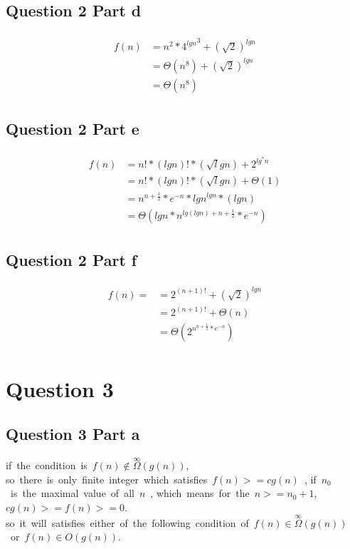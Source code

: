 \documentclass[paper=a4, fontsize=11pt]{scrartcl} %
\numberwithin{equation}{section} %
\numberwithin{figure}{section} %
\numberwithin{table}{section} %
\begin{document}
\subsection{Question 2 Part d}
\begin{align*}
\begin{split}
f(n) &=n^2*{4^{lgn}}^3+(\sqrt 2)^{lgn}\\
&=\Theta(n^8)+(\sqrt 2)^{lgn}\\
&=\Theta(n^8)
\end{split}
\end{align*}

\subsection{Question 2 Part e}
\begin{align*}
\begin{split}
f(n) &=n!*(lgn)!*(\sqrt lgn)+2^{lg^* n}\\
&=n!*(lgn)!*(\sqrt lgn)+\Theta(1)\\
&=n^{n+\frac{1}{2}}*e^{-n}*{lgn}^{lgn}*(lgn)\\
&=\Theta(lgn*n^{lg(lgn)+n+\frac{1}{2}}*e^{-n})
\end{split}
\end{align*}

\subsection{Question 2 Part f}
\begin{align*}
\begin{split}
f(n)= &=2^{(n+1)!}+{(\sqrt 2)}^{lgn}\\
&=2^{(n+1)!}+\Theta(n)\\
&=\Theta(2^{n^{n+\frac{1}{2}}*e^{-n}})
\end{split}
\end{align*}
\vspace{2cm}
\section{Question 3}
\subsection{Question 3 Part a}
\mbox{if the condition is $f(n)\notin \overset{\infty}{\Omega}(g(n))$}, \mbox{so there is only finite integer which satisfies $f(n)>=cg(n)$ },
\mbox{if $n_0$ is the maximal value of all $n$ },
\mbox{which means for the $n>={n_0}+1$,$cg(n)>=f(n)>=0$}.\\
\mbox{so it will satisfies either of the following condition of $f(n)\in \overset{\infty}{\Omega}(g(n))$ or $f(n)\in O(g(n))$}.
\end{document}
